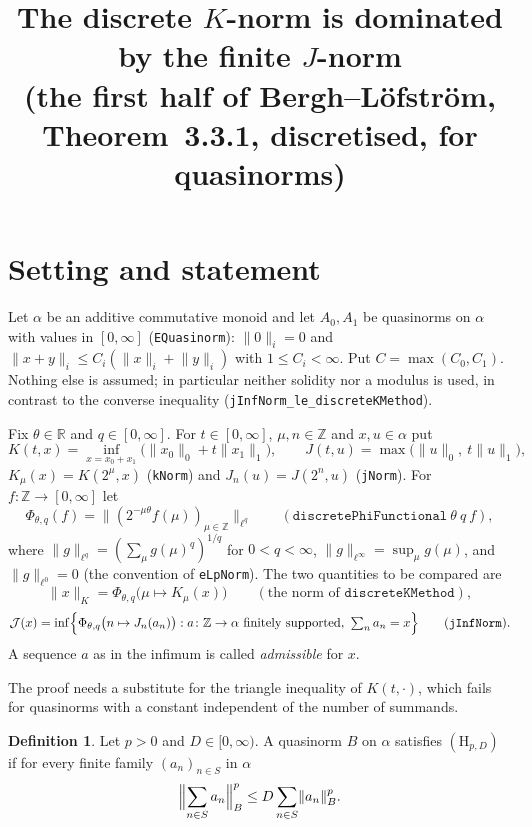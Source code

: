 \documentclass[11pt]{article}
\title{The discrete \(K\)-norm is dominated by the finite \(J\)-norm\\
\large (the first half of Bergh--L\"ofstr\"om, Theorem~3.3.1, discretised, for quasinorms)}
\date{}
\theoremstyle{definition}
\newtheorem{definition}[theorem]{Definition}
\theoremstyle{remark}
\newcommand{\norm}[2]{\lVert #1\rVert_{#2}}
\newcommand{\cJ}{\mathcal J}
\newcommand{\Z}{\mathbb Z}
\newcommand{\tsum}{\textstyle\sum}
\begin{document}
\maketitle

\section{Setting and statement}

Let \(\alpha\) be an additive commutative monoid and let \(A_0, A_1\) be quasinorms on
\(\alpha\) with values in \([0,\infty]\) (\texttt{EQuasinorm}): \(\norm{0}{i} = 0\) and
\(\norm{x+y}{i} \le C_i(\norm{x}{i} + \norm{y}{i})\) with \(1 \le C_i < \infty\). Put
\(C = \max(C_0, C_1)\). Nothing else is assumed; in particular neither solidity nor a modulus
is used, in contrast to the converse inequality (\texttt{jInfNorm\_le\_discreteKMethod}).

Fix \(\theta \in \mathbb R\) and \(q \in [0,\infty]\). For \(t \in [0,\infty]\),
\(\mu, n \in \Z\) and \(x, u \in \alpha\) put
\[
  K(t,x) = \inf_{x = x_0 + x_1}\bigl(\norm{x_0}{0} + t\norm{x_1}{1}\bigr),\qquad
  J(t,u) = \max\bigl(\norm{u}{0},\ t\norm{u}{1}\bigr),
\]
\(K_\mu(x) = K(2^\mu,x)\) (\texttt{kNorm}) and \(J_n(u) = J(2^n,u)\) (\texttt{jNorm}). For
\(f \colon \Z \to [0,\infty]\) let
\[
  \Phi_{\theta,q}(f) = \bigl\lVert (2^{-\mu\theta} f(\mu))_{\mu \in \Z}\bigr\rVert_{\ell^q}
  \qquad (\texttt{discretePhiFunctional}\ \theta\ q\ f),
\]
where \(\norm{g}{\ell^q} = (\sum_\mu g(\mu)^q)^{1/q}\) for \(0 < q < \infty\),
\(\norm{g}{\ell^\infty} = \sup_\mu g(\mu)\), and \(\norm{g}{\ell^0} = 0\) (the convention of
\texttt{eLpNorm}). The two quantities to be compared are
\[
  \norm{x}{K} = \Phi_{\theta,q}\bigl(\mu \mapsto K_\mu(x)\bigr)
  \qquad (\text{the norm of } \texttt{discreteKMethod}),
\]
\[
  \cJ(x) = \inf\Bigl\{\Phi_{\theta,q}\bigl(n \mapsto J_n(a_n)\bigr) :
  a \colon \Z \to \alpha \text{ finitely supported},\ \tsum_{n} a_n = x\Bigr\}
  \qquad (\texttt{jInfNorm}).
\]
A sequence \(a\) as in the infimum is called \emph{admissible} for \(x\).

The proof needs a substitute for the triangle inequality of \(K(t,\cdot)\), which fails for
quasinorms with a constant independent of the number of summands.

\begin{definition}\label{def:H}
  Let \(p > 0\) and \(D \in [0,\infty)\). A quasinorm \(B\) on \(\alpha\) satisfies
  \((\mathrm H_{p,D})\) if for every finite family \((a_n)_{n \in S}\) in \(\alpha\)
  \[
    \Bigl\lVert \sum_{n \in S} a_n \Bigr\rVert_B^p \le D \sum_{n \in S} \norm{a_n}{B}^p .
  \]
\end{definition}
\end{document}
